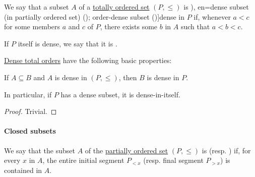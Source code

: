 \begin{definition}\label{def:dense_total_order}
  We say that a subset \( A \) of a \hyperref[def:totally_ordered_set]{totally ordered set} \( (P, \leq) \) is \term[ru=плотное (множество) (\cite[51]{ШеньВерещагин2020НачалаТеорииМножеств}), en=dense subset (in partially ordered set) (\cite[def. 1.10.5]{Harzheim2005OrderedSets}); order-dense subset (\cite[200]{Birkhoff1967LatticeTheory})]{dense} in \( P \) if, whenever \( a < c \) for some members \( a \) and \( c \) of \( P \), there exists some \( b \) in \( A \) such that \( a < b < c \).

  If \( P \) itself is dense, we say that it is .
\end{definition}

\begin{proposition}\label{thm:def:dense_total_order}
  \hyperref[def:dense_total_order]{Dense total orders} have the following basic properties:
  \begin{thmenum}
     If \( A \subseteq B \) and \( A \) is dense in \( (P, \leq) \), then \( B \) is dense in \( P \).

    In particular, if \( P \) has a dense subset, it is dense-in-itself.
  \end{thmenum}
\end{proposition}
\begin{proof}
   Trivial.
\end{proof}

\paragraph{Closed subsets}

\begin{definition}\label{def:closed_ordered_subset}
  We say that the subset \( A \) of the \hyperref[def:partially_ordered_set]{partially ordered set} \( (P, \leq) \) is  (resp. ) if, for every \( x \) in \( A \), the entire initial segment \( P_{<x} \) (resp. final segment \( P_{>x} \)) is contained in \( A \).
\end{definition}

